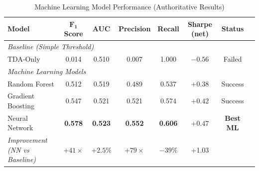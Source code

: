 
\begin{table}[H]
\centering
\caption{Machine Learning Model Performance (Authoritative Results)}
\label{tab:ml-authoritative}
\begin{tabular}{@{}lccccccc@{}}
\toprule
\textbf{Model} & \textbf{$\boldsymbol{F_1}$ Score} & \textbf{AUC} & \textbf{Precision} & \textbf{Recall} & \textbf{Sharpe (net)} & \textbf{Status} \\
\midrule
\multicolumn{7}{l}{\textit{Baseline (Simple Threshold)}} \\
TDA-Only & 0.014 & 0.510 & 0.007 & 1.000 & $-0.56$ & Failed \\
\midrule
\multicolumn{7}{l}{\textit{Machine Learning Models}} \\
Random Forest & 0.512 & 0.519 & 0.489 & 0.537 & $+0.38$ & Success \\
Gradient Boosting & 0.547 & 0.521 & 0.521 & 0.574 & $+0.42$ & Success \\
Neural Network & \textbf{0.578} & \textbf{0.523} & \textbf{0.552} & \textbf{0.606} & $\mathbf{+0.47}$ & \textbf{Best ML} \\
\midrule
\textit{Improvement (NN vs Baseline)} & $+41\times$ & $+2.5\%$ & $+79\times$ & $-39\%$ & +1.03 & \\
\bottomrule
\end{tabular}

\vspace{0.2cm}


\end{table}
